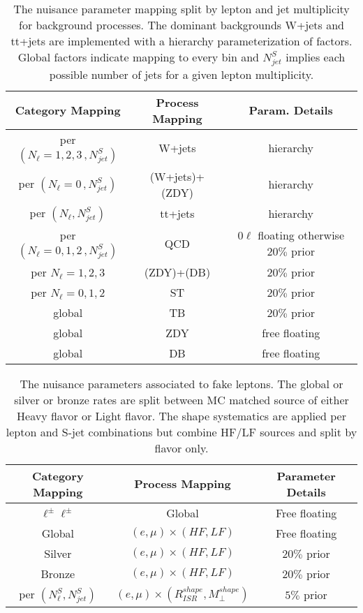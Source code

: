 \begin{table}
\centering
\caption{The nuisance parameter mapping split by lepton and jet multiplicity for background processes. The dominant backgrounds W+jets and tt+jets are implemented with a hierarchy parameterization of factors.  Global factors indicate mapping to every bin and $N_{jet}^S$ implies each possible number of jets for a given lepton multiplicity.}
 
\begin{tabular}{ccc}
\hline 
Category Mapping & Process Mapping & Param. Details \\ 
\hline 
\hline
per  $(N_\ell =1,2,3  \, ,N_{jet}^S)$ & W+jets & hierarchy \\ 

per $(N_\ell = 0 \, , N_{jet}^S)$ & (W+jets)+(ZDY) & hierarchy \\ 

per $(N_\ell, N_{jet}^S)$ & tt+jets & hierarchy \\ 
 
per $(N_\ell=0,1,2 \,, N_{jet}^S)$ & QCD & $0\ell$ floating otherwise $20\%$ prior \\ 
per $N_\ell=1,2,3$ & (ZDY)+(DB) & $20\%$ prior \\ 
per $N_\ell=0,1,2$ & ST & $20\%$ prior \\ 
global & TB & $20\%$ prior \\ 
global & ZDY & free floating \\ 
global & DB & free floating \\ 
\hline 
\end{tabular} 
\label{tab:procnuisance}

\end{table}

\begin{table}
\centering
\caption{The nuisance parameters associated to fake leptons. The global or silver or bronze rates are split between MC matched source of either Heavy flavor or Light flavor. The shape systematics are applied per lepton and S-jet combinations but combine HF/LF sources and split by flavor only.}
\begin{tabular}{ccc}

Category Mapping & Process Mapping & Parameter Details \\ 
\hline 
\hline
$\ell^\pm\ell^\pm$ & Global & Free floating \\ 
 
Global & $(e,\mu)\times(HF,LF)$ & Free floating \\ 
 
Silver & $(e,\mu)\times(HF,LF)$ & $20\%$ prior \\ 
 
Bronze & $(e,\mu)\times(HF,LF)$ & $20\%$ prior \\ 
 
per $(N_\ell^S,N_{jet}^S)$ & $(e,\mu)\times(R_{ISR}^{shape}, M_\perp^{shape})$ & $5\%$ prior \\ 
\hline 
\end{tabular} 
\label{tab:fakenuisance}

\end{table}


